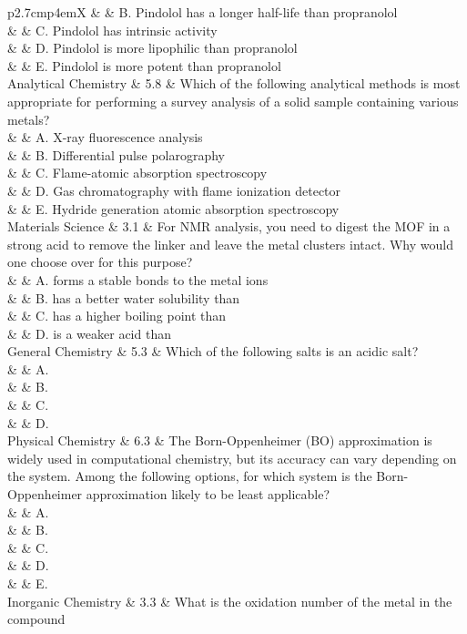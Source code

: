 \begin{xltabular}{\textwidth}{p{2.7cm}p{4em}X}
        & & B. Pindolol has a longer half-life than propranolol \\
        & & C. Pindolol has intrinsic activity \\
        & & D. Pindolol is more lipophilic than propranolol \\
        & & E. Pindolol is more potent than propranolol \\
        \midrule
        Analytical Chemistry & 5.8 & Which of the following analytical methods is most appropriate for performing a survey analysis of a solid sample containing various metals? \\
        & & A. X-ray fluorescence analysis \\
        & & B. Differential pulse polarography \\
        & & C. Flame-atomic absorption spectroscopy \\
        & & D. Gas chromatography with flame ionization detector \\
        & & E. Hydride generation atomic absorption spectroscopy \\
        \midrule
        Materials Science & 3.1 & For NMR analysis, you need to digest the MOF in a strong acid to remove the linker and leave the metal clusters intact. Why would one choose  over  for this purpose? \\
        & & A.  forms a stable bonds to the metal ions \\
        & & B.  has a better water solubility than  \\
        & & C.  has a higher boiling point than  \\
        & & D.  is a weaker acid than  \\
        \midrule
        General Chemistry & 5.3 & Which of the following salts is an acidic salt? \\
        & & A.  \\
        & & B.  \\
        & & C.  \\
        & & D.  \\
        \midrule
        Physical Chemistry & 6.3 & The Born-Oppenheimer (BO) approximation is widely used in computational chemistry, but its accuracy can vary depending on the system. Among the following options, for which system is the Born-Oppenheimer approximation likely to be least applicable? \\
        & & A.  \\
        & & B.  \\
        & & C.  \\
        & & D.  \\
        & & E.  \\
        \midrule
        Inorganic Chemistry & 3.3 & What is the oxidation number of the metal in the compound \\
        \bottomrule
    \label{tab:chembench_corpus_topic}
\end{xltabular}

